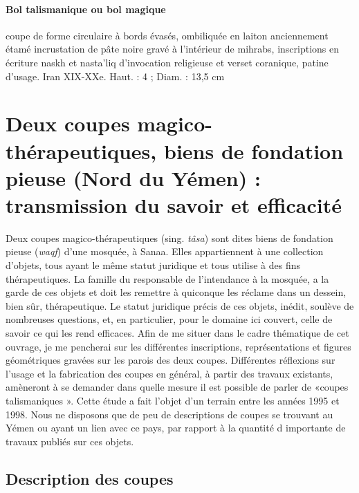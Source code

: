 \paragraph{Bol talismanique ou bol magique} coupe de forme circulaire à bords évasés, ombiliquée en laiton anciennement étamé incrustation de pâte noire gravé à l'intérieur de mihrabs, inscriptions en écriture naskh et nasta'liq d'invocation religieuse et verset coranique, patine d'usage. Iran XIX-XXe.
Haut. : 4 ; Diam. : 13,5 cm


\section{Deux coupes magico-thérapeutiques, biens de fondation pieuse (Nord du Yémen) : transmission du savoir et efficacité}
 
Deux coupes magico-thérapeutiques (sing. \textit{tâsa}) sont dites biens de fondation pieuse ({\textit{waqf}}) d'une mosquée, à Sanaa. Elles appartiennent à une collection d'objets, tous ayant le même statut juridique et tous utilise à des fins thérapeutiques. La famille du responsable de l'intendance à la mosquée, a la garde de ces objets et doit les remettre à quiconque les réclame dans un dessein, bien sûr, thérapeutique. Le statut juridique précis de ces objets, inédit, soulève de nombreuses questions, et, en particulier, pour le domaine ici couvert, celle de savoir ce qui les rend efficaces.
Afin de me situer dans le cadre thématique de cet ouvrage, je me pencherai sur les différentes inscriptions, représentations et figures géométriques gravées sur les parois des deux coupes. Différentes réflexions sur l'usage et la fabrication des coupes en général, à partir des travaux existants, amèneront à se demander dans quelle mesure il est possible de parler de «coupes talismaniques ».
Cette étude a fait l'objet d'un terrain entre les années 1995 et 1998.
Nous ne disposons que de peu de descriptions de coupes se trouvant au Yémen ou ayant un lien avec ce pays, par rapport à la quantité d importante de travaux publiés sur ces objets.
\subsection{Description des coupes}


